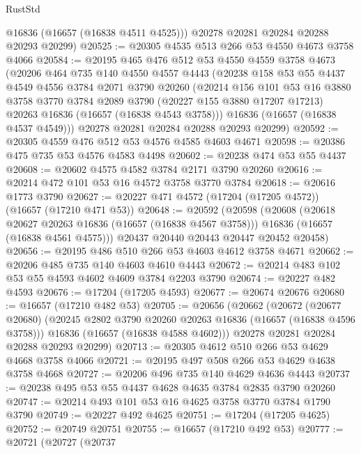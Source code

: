 \begin{lexlean}{RustStd}
\begin{coremodule}
        @16836
        (@16657 (@16838 @4511 @4525)))
      @20278
      @20281
      @20284
      @20288
      @20293
      @20299)
@20525 := @20305 @4535 @513 @266 @53 @4550 @4673 @3758 @4066
@20584 := @20195
    @465
    @476
    @512
    @53
    @4550
    @4559
    @3758
    @4673
    (@20206
      @464
      @735
      @140
      @4550
      @4557
      @4443
      (@20238
        @158
        @53
        @55
        @4437
        @4549
        @4556
        @3784
        @2071
        @3790
        @20260
        (@20214
          @156
          @101
          @53
          @16
          @3880
          @3758
          @3770
          @3784
          @2089
          @3790
          (@20227 @155 @3880 @17207 @17213)
          @20263
          @16836
          (@16657 (@16838 @4543 @3758)))
        @16836
        (@16657 (@16838 @4537 @4549)))
      @20278
      @20281
      @20284
      @20288
      @20293
      @20299)
@20592 := @20305 @4559 @476 @512 @53 @4576 @4585 @4603 @4671
@20598 := @20386 @475 @735 @53 @4576 @4583 @4498
@20602 := @20238 @474 @53 @55 @4437
@20608 := @20602 @4575 @4582 @3784 @2171 @3790 @20260
@20616 := @20214 @472 @101 @53 @16 @4572 @3758 @3770 @3784
@20618 := @20616 @1773 @3790
@20627 := @20227 @471 @4572 (@17204 (@17205 @4572)) (@16657 (@17210 @471 @53))
@20648 := @20592
    (@20598
      (@20608
        (@20618 @20627 @20263 @16836 (@16657 (@16838 @4567 @3758)))
        @16836
        (@16657 (@16838 @4561 @4575)))
      @20437
      @20440
      @20443
      @20447
      @20452
      @20458)
@20656 := @20195 @486 @510 @266 @53 @4603 @4612 @3758 @4671
@20662 := @20206 @485 @735 @140 @4603 @4610 @4443
@20672 := @20214 @483 @102 @53 @55 @4593 @4602 @4609 @3784 @2203 @3790
@20674 := @20227 @482 @4593
@20676 := @17204 (@17205 @4593)
@20677 := @20674 @20676
@20680 := @16657 (@17210 @482 @53)
@20705 := @20656
    (@20662
      (@20672
        (@20677 @20680)
        (@20245 @2802 @3790 @20260 @20263 @16836 (@16657 (@16838 @4596 @3758)))
        @16836
        (@16657 (@16838 @4588 @4602)))
      @20278
      @20281
      @20284
      @20288
      @20293
      @20299)
@20713 := @20305 @4612 @510 @266 @53 @4629 @4668 @3758 @4066
@20721 := @20195 @497 @508 @266 @53 @4629 @4638 @3758 @4668
@20727 := @20206 @496 @735 @140 @4629 @4636 @4443
@20737 := @20238 @495 @53 @55 @4437 @4628 @4635 @3784 @2835 @3790 @20260
@20747 := @20214 @493 @101 @53 @16 @4625 @3758 @3770 @3784 @1790 @3790
@20749 := @20227 @492 @4625
@20751 := @17204 (@17205 @4625)
@20752 := @20749 @20751
@20755 := @16657 (@17210 @492 @53)
@20777 := @20721
    (@20727
      (@20737

\end{coremodule}
\end{lexlean}
